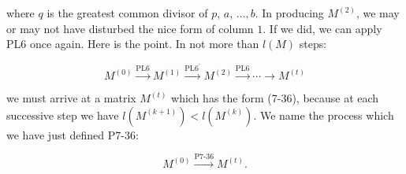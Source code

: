 where \(q\) is the greatest common divisor of \(p\), \(a\), \(\ldots,b\). In producing \(M^{(2)}\), we may or may not have disturbed the nice form of column \(1\). If we did, we can apply PL6 once again. Here is the point. In not more than \(l(M)\) steps:

\[M^{(0)}\stackrel{{\text{PL6}}}{{\longrightarrow}}M^{(1)} \stackrel{{\text{PL6}^{\prime}}}{{\longrightarrow}}M^{(2)} \stackrel{{\text{PL6}}}{{\longrightarrow}}\cdots\to M^{(t)}\]

we must arrive at a matrix \(M^{(t)}\) which has the form (7-36), because at each successive step we have \(l(M^{(k+1)})<l(M^{(k)})\). We name the process which we have just defined P7-36:

\[M^{(0)}\stackrel{{\text{P7-36}}}{{\longrightarrow}}M^{(t)}.\] 